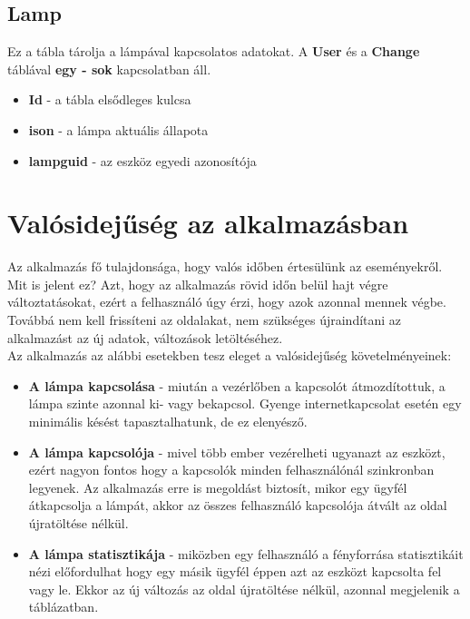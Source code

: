 \documentclass[a4paper,12pt]{report}
\begin{document}
\subsection{Lamp}
    Ez a tábla tárolja a lámpával kapcsolatos adatokat. A \textbf{User} és a \textbf{Change} táblával \textbf{egy - sok} kapcsolatban
    áll.

\begin{itemize}
    \item \textbf{Id} - a tábla elsődleges kulcsa
    \item \textbf{ison} - a lámpa aktuális állapota
    \item \textbf{lampguid} - az eszköz egyedi azonosítója
\end{itemize}

\section{Valósidejűség az alkalmazásban}
    Az alkalmazás fő tulajdonsága, hogy valós időben értesülünk az eseményekről. Mit is jelent ez? Azt, hogy az alkalmazás
    rövid időn belül hajt végre változtatásokat, ezért a felhasználó úgy érzi, hogy azok azonnal mennek végbe. Továbbá
    nem kell frissíteni az oldalakat, nem szükséges újraindítani az alkalmazást az új adatok, változások letöltéséhez.\\

    Az alkalmazás az alábbi esetekben tesz eleget a valósidejűség követelményeinek:

\begin{itemize}
    \item \textbf{A lámpa kapcsolása} - miután a vezérlőben a kapcsolót átmozdítottuk, a lámpa szinte azonnal ki- vagy bekapcsol.
    Gyenge internetkapcsolat esetén egy minimális késést tapasztalhatunk, de ez elenyésző.
    \item \textbf{A lámpa kapcsolója} - mivel több ember vezérelheti ugyanazt az eszközt, ezért nagyon fontos hogy a kapcsolók
    minden felhasználónál szinkronban legyenek. Az alkalmazás erre is megoldást biztosít, mikor egy ügyfél átkapcsolja a lámpát,
    akkor az összes felhasználó kapcsolója átvált az oldal újratöltése nélkül.
    \item \textbf{A lámpa statisztikája} - miközben egy felhasználó a fényforrása statisztikáit nézi előfordulhat hogy egy másik
    ügyfél éppen azt az eszközt kapcsolta fel vagy le. Ekkor az új változás az oldal újratöltése nélkül, azonnal megjelenik a táblázatban.
\end{itemize}
\end{document}
